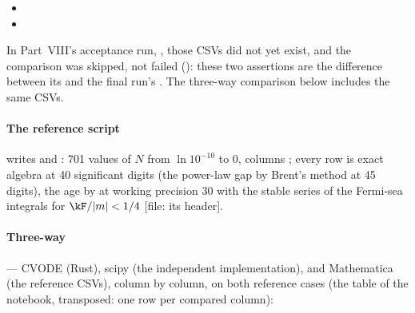 \begin{itemize}
  \item {}
  \item {}
\end{itemize}
In Part~VIII's acceptance run, , those CSVs did not yet exist,
and the comparison was skipped, not failed (): these two assertions are the difference between its  and the final
run's . The three-way comparison below includes the same CSVs.

\paragraph{The reference script}  writes
 and : 701 values of $N$ from
$\ln10^{-10}$ to 0, columns ; every row is
exact algebra at 40 significant digits (the power-law gap by Brent's method at 45 digits), the age by
 at working precision 30 with the stable series of the Fermi-sea integrals for $\kF/|m|<1/4$
[file: its header].

\paragraph{Three-way}  --- CVODE (Rust), scipy (the
independent implementation), and Mathematica (the reference CSVs), column by column, on both reference cases
(the table of the notebook, transposed: one row per compared column):

